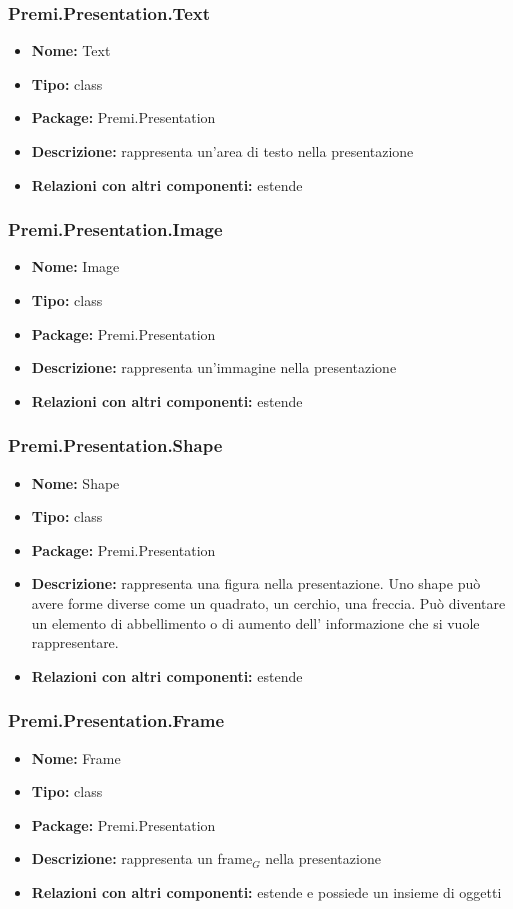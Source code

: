 \subsubsection{Premi.Presentation.Text}
\begin{itemize}
  \item \textbf{Nome:} Text
  \item \textbf{Tipo:} class
  \item \textbf{Package:} Premi.Presentation
  \item \textbf{Descrizione:} rappresenta un'area di testo nella presentazione
    \item \textbf{Relazioni con altri componenti:} estende 
\end{itemize}
\subsubsection{Premi.Presentation.Image}
\begin{itemize}
  \item \textbf{Nome:} Image
  \item \textbf{Tipo:} class
  \item \textbf{Package:} Premi.Presentation
  \item \textbf{Descrizione:} rappresenta un'immagine nella presentazione
      \item \textbf{Relazioni con altri componenti:} estende 
\end{itemize}
\subsubsection{Premi.Presentation.Shape}
\begin{itemize}
  \item \textbf{Nome:} Shape
  \item \textbf{Tipo:} class
  \item \textbf{Package:} Premi.Presentation
  \item \textbf{Descrizione:} rappresenta una figura nella presentazione. Uno shape può avere forme diverse come un quadrato, un cerchio, una freccia. Può diventare un elemento di abbellimento o di aumento dell' informazione che si vuole rappresentare. 
      \item \textbf{Relazioni con altri componenti:} estende 
\end{itemize}
\subsubsection{Premi.Presentation.Frame}
\begin{itemize}
  \item \textbf{Nome:} Frame
  \item \textbf{Tipo:} class
  \item \textbf{Package:} Premi.Presentation
  \item \textbf{Descrizione:} rappresenta un frame$_G$ nella presentazione
  \item \textbf{Relazioni con altri componenti:} estende  e possiede un insieme di oggetti 
\end{itemize}
